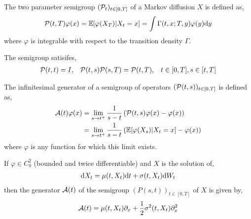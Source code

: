 \documentclass[12pt]{article}
\begin{document}
\begin{definition}
The two parameter semigroup \( (\mathcal{P}_t)_{t\in[0,T]} \) of a Markov diffusion \( X \) is defined as,
\begin{align*}
    \mathcal{P}(t,T)\varphi(x) = \mathbb{E}[\varphi(X_T) | X_t = x] = \int\Gamma(t,x;T,y)\varphi(y) \mathrm{d} y
\end{align*}
where \( \varphi \) is integrable with respect to the transition density \( \Gamma \).
\end{definition}


\begin{theorem}
The semigroup satisifes,
\begin{align*}
    \mathcal{P}(t,t) = I, && \mathcal{P}(t,s)\mathcal{P}(s,T) = \mathcal{P}(t,T), && t\in[0,T], s\in[t,T]
\end{align*}
\end{theorem}

\begin{definition}
The infinitesimal generator of a semigroup of operators \( (\mathcal{P}(t,s))_{t\in[0,T]} \) is defined as,
\begin{align*}
    \mathcal{A}(t) \varphi(x) &= \lim_{s\to t^+} \frac{1}{s-t} \left( \mathcal{P}(t,s) \varphi(x) - \varphi(x) \right)
    \\&=  \lim_{s\to t^+} \frac{1}{s-t} \left( \mathbb{E}[\varphi(X_s)|X_t = x] - \varphi(x) \right)
\end{align*}
where \( \varphi \) is any function for which this limit exists.
\end{definition}

\begin{theorem}
If \( \varphi\in C^2_0 \) (bounded and twice differentiable) and \( X \) is the solution of,
\begin{align*}
    \mathrm{d} X_t = \mu(t,X_t) \mathrm{d} t + \sigma(t,X_t)\mathrm{d} W_t
\end{align*}
then the generator \( \mathcal{A}(t) \) of the semigroup \( (P(s,t))_{t\in[0,T]} \) of \( X \) is given by,
\begin{align*}
    \mathcal{A}(t) = \mu(t,X_t)\partial_x + \frac{1}{2}\sigma^2(t,X_t)\partial_x^2
\end{align*}
\end{theorem}
\end{document}
